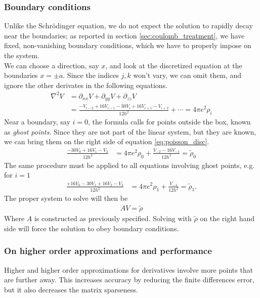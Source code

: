\subsubsection{Boundary conditions}
Unlike the Schr\"odinger equation, we do not expect the solution to rapidly decay near the boundaries; as reported in section \ref{sec:coulomb_treatment}, we have fixed, non-vanishing boundary conditions, which we have to properly impose on the system.
\\We can choose a direction, say $x$, and look at the discretized equation at the boundaries $x=\pm a$. Since the indices $j,k$ won't vary, we can omit them, and ignore the other derivates in the following equations.
\begin{align}
    \label{eq:poisson_disc}
    \nabla^2 V &= \partial_{xx} V + \partial_{yy}V + \partial_{zz}V\nonumber \\
    &= \frac{-V_{i-2} + 16V_{i-1} -30V_i + 16V_{i+1} - V_{i+2}}{12h^2}+\cdots=4\pi e^2 \rho_i
\end{align}
Near a boundary, say $i = 0$, the formula calls for points outside the box, known as \textit{ghost points}. Since they are not part of the linear system, but they are known, we can bring them on the right side of equation \eqref{eq:poisson_disc}.
\begin{align}
    \frac{-30 V_0 + 16 V_1 - V_2 }{12h^2} &= 4\pi e^2 \rho_0 +\frac{ V_{-2} -16V_{-1}}{12h^2} = \tilde\rho_0
\end{align}
The same procedure must be applied to all equations involving ghost points, e.g. for $i=1$
\begin{align}
    \frac{+16V_0 -30V_{1} + 16 V_2 - V_3}{12h^2} &= 4\pi e^2 \rho_1 + \frac{V_{-1} }{12h^2} = \tilde\rho_1.
\end{align}
The proper system to solve will then be
\begin{align}
A V = \tilde \rho
\end{align}
Where $A$ is constructed as previously specified. Solving with $\tilde \rho $ on the right hand side will force the solution to obey boundary conditions.
\subsubsection{On higher order approximations and performance}
Higher and higher order approximations for derivatives involve more points that are further away. This increases accuracy by reducing the finite differences error, but it also decreases the matrix sparseness.